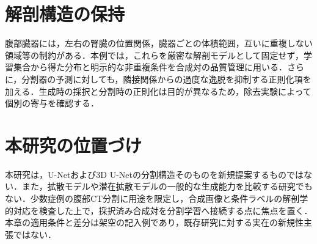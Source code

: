 \section{解剖構造の保持}

腹部臓器には，左右の腎臓の位置関係，臓器ごとの体積範囲，互いに重複しない領域等の制約がある．本例では，これらを厳密な解剖モデルとして固定せず，学習集合から得た分布と明示的な非重複条件を合成対の品質管理に用いる．さらに，分割器の予測に対しても，隣接関係からの過度な逸脱を抑制する正則化項を加える．生成時の採択と分割時の正則化は目的が異なるため，除去実験によって個別の寄与を確認する．

\section{本研究の位置づけ}

本研究は，U-Net\cite{ronneberger2015unet}および3D U-Net\cite{cicek20163dunet}の分割構造そのものを新規提案するものではない．また，拡散モデル\cite{ho2020ddpm}や潜在拡散モデル\cite{rombach2022ldm}の一般的な生成能力を比較する研究でもない．少数症例の腹部CT分割に用途を限定し，合成画像と条件ラベルの解剖学的対応を検査した上で，採択済み合成対を分割学習へ接続する点に焦点を置く．本章の適用条件と差分は架空の記入例であり，既存研究に対する実在の新規性主張ではない．
